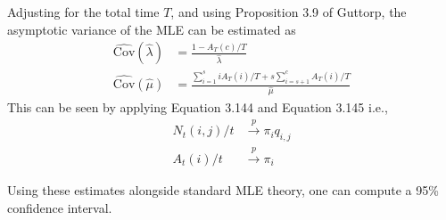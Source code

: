 \documentclass[11pt]{article}
\newcommand{\Cov}{\text{Cov}}
\begin{document}
\begin{enumerate}
Adjusting for the total time $T$, and using Proposition 3.9 of Guttorp, the asymptotic variance of the MLE can be estimated as
\begin{align*}
	\widehat{\Cov}(\widehat{\lambda}) &= \frac{1 - A_T(c) / T}{\widehat{\lambda}} \\
	\widehat{\Cov}(\widehat{\mu}) &= \frac{\sum_{i=1}^s i A_T(i) / T + s \sum_{i=s+1}^c A_T(i) / T }{\widehat{\mu}}
\end{align*}
This can be seen by applying Equation 3.144 and Equation 3.145 i.e.,
\begin{align*}
	N_t(i, j) / t &\stackrel{p}{\to} \pi_i q_{i, j} \\
	A_t(i) / t &\stackrel{p}{\to} \pi_i
\end{align*}

Using these estimates alongside standard MLE theory, one can compute a 95\% confidence interval.


\end{enumerate}
\end{document}
